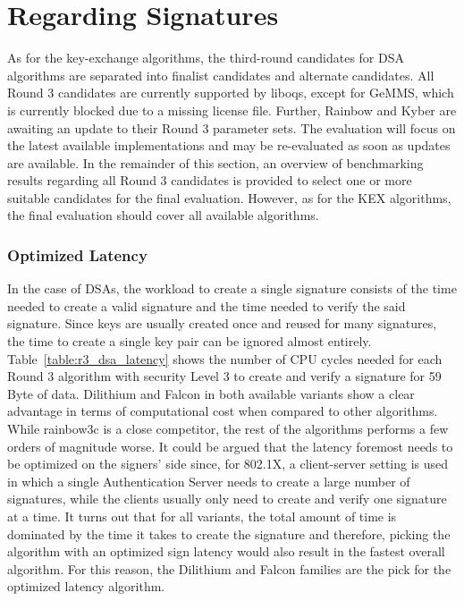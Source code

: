 \section{Regarding Signatures}

As for the key-exchange algorithms, the third-round candidates for \ac{DSA} algorithms are separated into finalist candidates and alternate candidates. All Round 3 candidates are currently supported by liboqs, except for GeMMS, which is currently blocked due to a missing license file. Further, Rainbow and Kyber are awaiting an update to their Round 3 parameter sets. The evaluation will focus on the latest available implementations and may be re-evaluated as soon as updates are available. In the remainder of this section, an overview of benchmarking results regarding all Round 3 candidates is provided to select one or more suitable candidates for the final evaluation. However, as for the \ac{KEX} algorithms, the final evaluation should cover all available algorithms.

\subsubsection{Optimized Latency}

In the case of \acp{DSA}, the workload to create a single signature consists of the time needed to create a valid signature and the time needed to verify the said signature. Since keys are usually created once and reused for many signatures, the time to create a single key pair can be ignored almost entirely. Table~\ref{table:r3_dsa_latency} shows the number of CPU cycles needed for each Round 3 algorithm with security Level 3 to create and verify a signature for 59 Byte of data. Dilithium and Falcon in both available variants show a clear advantage in terms of computational cost when compared to other algorithms. While rainbow3c is a close competitor, the rest of the algorithms performs a few orders of magnitude worse. It could be argued that the latency foremost needs to be optimized on the signers' side since, for 802.1X, a client-server setting is used in which a single Authentication Server needs to create a large number of signatures, while the clients usually only need to create and verify one signature at a time. It turns out that for all variants, the total amount of time is dominated by the time it takes to create the signature and therefore, picking the algorithm with an optimized sign latency would also result in the fastest overall algorithm. For this reason, the Dilithium and Falcon families are the pick for the optimized latency algorithm. 

